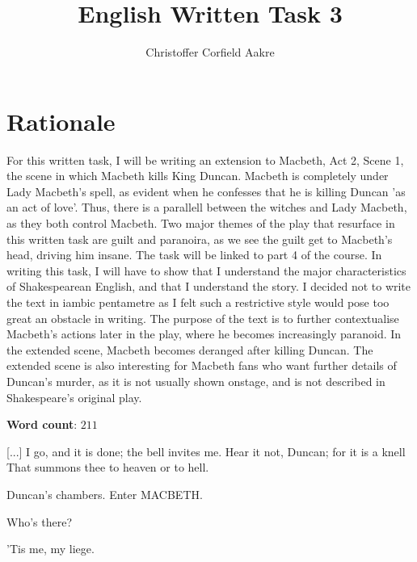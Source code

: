 \documentclass{article}
\title{English Written Task 3}
\author{Christoffer Corfield Aakre}
\begin{document}
\maketitle


\section*{\centering Rationale}

For this written task, I will be writing an extension to Macbeth, Act 2, Scene 1, the scene in which Macbeth kills King Duncan. Macbeth is completely under Lady Macbeth's spell, as evident when he confesses that he is killing Duncan 'as an act of love'. Thus, there is a parallell between the witches and Lady Macbeth, as they both control Macbeth. Two major themes of the play that resurface in this written task are guilt and paranoira, as we see the guilt get to Macbeth's head, driving him insane. The task will be linked to part 4 of the course. In writing this task, I will have to show that I understand the major characteristics of Shakespearean English, and that I understand the story. I decided not to write the text in iambic pentametre as I felt such a restrictive style would pose too great an obstacle in writing. The purpose of the text is to further contextualise Macbeth's actions later in the play, where he becomes increasingly paranoid. In the extended scene, Macbeth becomes deranged after killing Duncan. The extended scene is also interesting for Macbeth fans who want further details of Duncan's murder, as it is not usually shown onstage, and is not described in Shakespeare's original play.

\textbf{Word count}: $211$

\pagebreak

\begin{dramatis}
\end{dramatis}

\setcounter{act}{1}
\act{}
\scene{}
[...] I go, and it is done; the bell invites me.
Hear it not, Duncan; for it is a knell
That summons thee to heaven or to hell.

\begin{dida}
Duncan's chambers. Enter MACBETH.
\end{dida}

\duncan
Who's there?

\macbeth
'Tis me, my liege.
\end{document}

